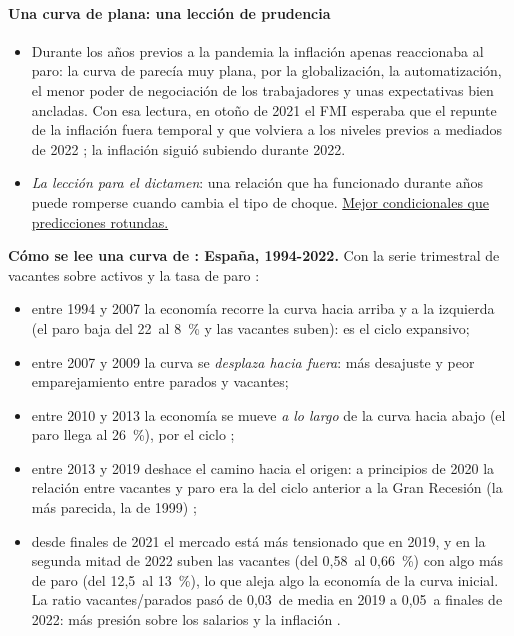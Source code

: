 \documentclass[11pt]{article}
\begin{document}
\paragraph{Una curva de  plana: una lección de prudencia}
\begin{itemize}
\item Durante los años previos a la pandemia la inflación apenas reaccionaba al paro: la curva de  parecía muy plana, por la globalización, la automatización, el menor poder de negociación de los trabajadores y unas expectativas bien ancladas. Con esa lectura, en otoño de 2021 el FMI esperaba que el repunte de la inflación fuera temporal y que volviera a los niveles previos a mediados de 2022 \parencite{FMI2021WEOoct}; la inflación siguió subiendo durante 2022.
\item \emph{La lección para el dictamen}: una relación que ha funcionado durante años puede romperse cuando cambia el tipo de choque. \uline{Mejor condicionales que predicciones rotundas.}
\end{itemize}

\begin{anotaciones}
\textbf{Cómo se lee una curva de : España, 1994-2022.} Con la serie trimestral de vacantes sobre activos y la tasa de paro \parencite{Bosca2023Ucrania,FMI2023ArticuloIV2022}:
\begin{itemize}
\item entre 1994 y 2007 la economía recorre la curva hacia arriba y a la izquierda (el paro baja del 22~al 8~\% y las vacantes suben): es el ciclo expansivo;
\item entre 2007 y 2009 la curva se \emph{desplaza hacia fuera}: más desajuste y peor emparejamiento entre parados y vacantes;
\item entre 2010 y 2013 la economía se mueve \emph{a lo largo} de la curva hacia abajo (el paro llega al 26~\%), por el ciclo \parencite{Bosca2023Ucrania};
\item entre 2013 y 2019 deshace el camino hacia el origen: a principios de 2020 la relación entre vacantes y paro era la del ciclo anterior a la Gran Recesión (la más parecida, la de 1999) \parencite{Bosca2023Ucrania};
\item desde finales de 2021 el mercado está más tensionado que en 2019, y en la segunda mitad de 2022 suben las vacantes (del 0,58~al 0,66~\%) con algo más de paro (del 12,5~al 13~\%), lo que aleja algo la economía de la curva inicial. La ratio vacantes/parados pasó de 0,03~de media en 2019 a 0,05~a finales de 2022: más presión sobre los salarios y la inflación \parencite{Bosca2023Ucrania}.
\end{itemize}
\end{anotaciones}
\end{document}
